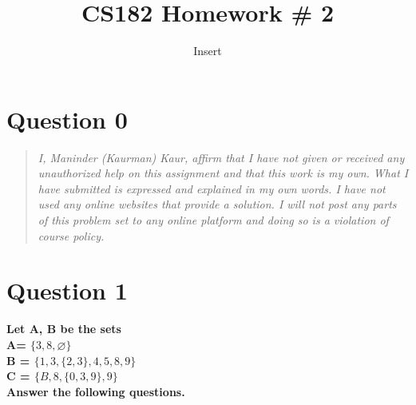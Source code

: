 \documentclass[11pt]{article}
\title{CS182 Homework \# 2}
\author{Insert}
\begin{document}
\maketitle

\section*{Question 0}
\begin{quote}
    \textit{I, Maninder (Kaurman) Kaur, affirm that I have not given or received any unauthorized help on this assignment and that this work is my own. What I have submitted is expressed and explained in my own words. I have not used any online websites that provide a solution. I will not post any parts of this problem set to any online platform and doing so is a violation of course policy.}
\end{quote}

\clearpage
\section*{Question 1}

    \textbf{Let A, B be the sets \\
A= \(\{3,8,\varnothing\}\) \\
B = \(\{1, 3, \{2, 3\}, 4, 5, 8, 9\}\) \\
C = \(\{B, 8, \{0, 3, 9\}, 9\}\) \\
Answer the following questions.}
\end{document}
